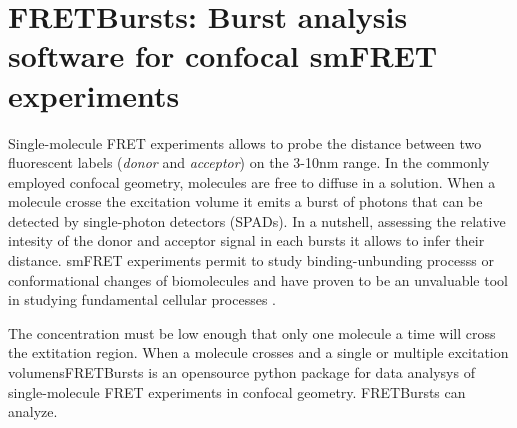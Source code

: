 \section{FRETBursts: Burst analysis software for confocal smFRET experiments}
\author{Antonino Ingargiola}

Single-molecule FRET experiments allows to probe the distance between two fluorescent labels (\textit{donor} and \textit{acceptor}) on the 3-10nm range. In the commonly employed confocal geometry, molecules are free to diffuse in a solution. When a molecule crosse the excitation volume it emits a burst of photons that can be detected by single-photon detectors (SPADs). In a nutshell, assessing the relative intesity of the donor and acceptor signal in each bursts it allows to infer their distance. smFRET experiments permit to study binding-unbunding processs or conformational changes of biomolecules and have proven to be an unvaluable tool in studying fundamental cellular processes \cite{Kapanidis_2006}.

The concentration must be low enough that only one molecule a time will cross the extitation region. When a molecule crosses and a single or multiple excitation volumensFRETBursts is an opensource python package for data analysys of single-molecule FRET experiments in confocal geometry. FRETBursts can analyze.

